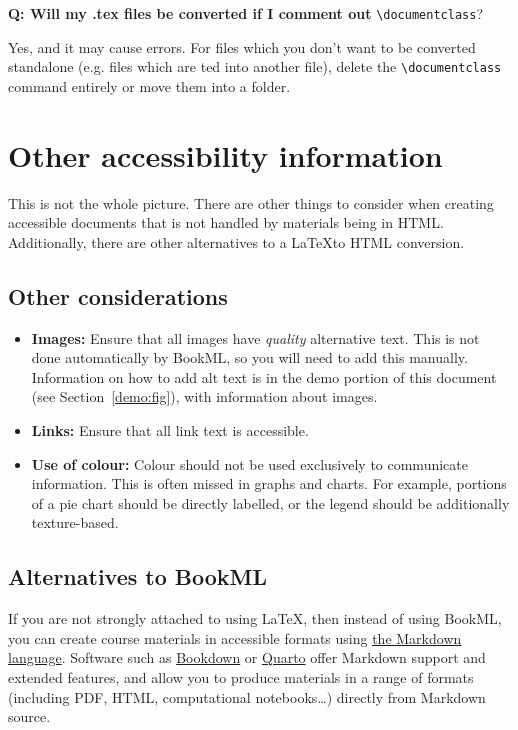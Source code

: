 \noindent\textbf{Q: Will my .tex files be converted if I comment out} \verb|\|\verb|documentclass|? 
\begin{ans}
    Yes, and it may cause errors. For files which you don't want to be converted standalone (e.g. files which are \verb||ted into another file), delete the \verb|\|\verb|documentclass| command entirely or move them into a folder.
\end{ans}


\section{Other accessibility information}
\label{sec:otheraccessibility}

This is not the whole picture. There are other things to consider when creating accessible documents that is not handled by materials being in HTML. Additionally, there are other alternatives to a \LaTeX to HTML conversion.

\subsection{Other considerations}
\label{ssec:otheraccessibility}

\begin{itemize}
    \item \textbf{Images:} Ensure that all images have \textit{quality} alternative text. This is not done automatically by BookML, so you will need to add this manually. Information on how to add alt text is in the demo portion of this document (see Section~\ref{demo:fig}), with information about images.
    \item \textbf{Links:} Ensure that all link text is accessible.
    \item \textbf{Use of colour:} Colour should not be used exclusively to communicate information. This is often missed in graphs and charts. For example, portions of a pie chart should be directly labelled, or the legend should be additionally texture-based.
\end{itemize}

\subsection{Alternatives to BookML}
\label{ssec:alternatives}

If you are not strongly attached to using \LaTeX, then instead of using BookML, you can create course materials in accessible formats using \href{https://www.markdownguide.org/basic-syntax/}{the Markdown language}. Software such as \href{https://bookdown.org/}{Bookdown} or \href{https://quarto.org/}{Quarto} offer Markdown support and extended features, and allow you to produce materials in a range of formats (including PDF, HTML, computational notebooks\ldots) directly from Markdown source.

